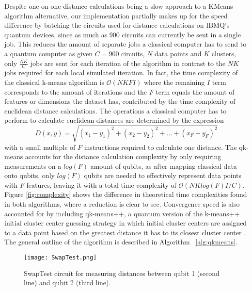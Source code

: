 \documentclass[conference]{IEEEtran}
\begin{document}
Despite one-on-one distance calculations being a slow approach to a KMeans algorithm alternative, our implementation partially makes up for the speed difference by batching the circuits used for distance calculations on IBMQ's quantum devices, since as much as 900 circuits can currently be sent in a single job. This reduces the amount of separate jobs a classical computer has to send to a quantum computer as given \(C = 900\) circuits, \(N\) data points and \(K\) clusters, only \(\frac{NK}{C}\) jobs are sent for each iteration of the algorithm in contrast to the \(NK\) jobs required for each local simulated iteration. In fact, the time complexity of the classical k-means algorithm is \(\mathcal{O}(NKFI)\) where the remaining \(I\) term corresponds to the amount of iterations and the \(F\) term equals the amount of features or dimensions the dataset has, contributed by the time complexity of euclidean distance calculations. The operations a classical computer has to perform to calculate euclidean distances are determined by the expression
$$
D(x,y) = \sqrt{(x_1 - y_1)^2 + (x_2 - y_2)^2 + ... + (x_F - y_F)^2 }
$$
with a small multiple of \(F\) instructions required to calculate one distance. The qk-means accounts for the distance calculation complexity by only requiring measurements on a \(log(F)\) amount of qubits, as after mapping classical data onto qubits, only \(log(F)\) qubits are needed to effectively represent data points with \(F\) features, leaving it with a total time complexity of \(\mathcal{O}(NKlog(F)I/C)\). Figure \ref{fig:complexity} shows the difference in theoretical time complexities found in both algorithms, where a reduction is clear to see. Convergence speed is also accounted for by including qk-means++, a quantum version of the k-means++ initial cluster center guessing strategy in which initial cluster centers are assigned to a data point based on the greatest distance it has to its closest cluster center \cite{10.5555/1283383.1283494}. The general outline of the algorithm is described in Algorithm ~\ref{alg:qkmeans}.

\begin{figure}
\centering
\texttt{[image: SwapTest.png]}
\caption{SwapTest circuit for measuring distances between qubit 1 (second line) and qubit 2 (third line).}
\label{fig:SwapTest}
\end{figure}
\end{document}
